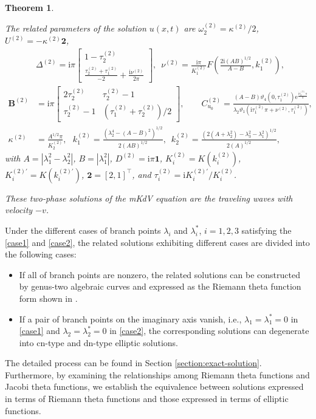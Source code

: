 \documentclass[11pt,reqno]{amsart}
\newcommand{\ii}{\mathrm{i}}
\newcommand{\cn}{\mathrm{cn}}
\newcommand{\dn}{\mathrm{dn}}
\newcommand{\ee}{\mathrm{e}}
\newtheorem{theorem}{Theorem}
\numberwithin{equation}{section}
\begin{document}
\begin{theorem}
\begin{itemize}
		The related parameters of the solution $u(x,t)$ are $\omega_{2}^{(2)}=\kappa^{(2)}/2$, $U^{(2)}=-\kappa^{(2)}\mathbf{2}$,
		\begin{subequations}\label{eq:u-parameters-cn}
			\begin{align}
				&
				\Delta^{(2)}=\ii \pi \begin{bmatrix}
					1-\tau^{(2)}_2 \\
					\frac{\tau^{(2)}_2+\tau^{(2)}_1}{-2}+\frac{\ii\nu^{(2)} }{2 \pi}
				\end{bmatrix},\,\,\, \nu^{(2)}=\frac{\ii \pi}{ K^{(2)}_1}F\left(\frac{2\ii(AB)^{1/2}}{A-B}, k^{(2)}_1\right)\!, \,\,\, \label{eq:u-parameters-cn-U}\\
					\mathbf{B}^{(2)}&=\ii \pi \begin{bmatrix}
					2 \tau^{(2)}_2  & \tau^{(2)}_2-1 \\ 
					\tau^{(2)}_2-1 & (\tau^{(2)}_1+\tau^{(2)}_2)/2
				\end{bmatrix},  \qquad 	C_{u_0}^{(2)}=\frac{(A-B)\vartheta_4(0,\tau^{(2)}_1)\ee^{\frac{\ii\tau^{(2)}_2\pi}{4}}}{\lambda_2\vartheta_1(\ii\tau^{(2)}_1\pi+\nu ^{(2)},\tau^{(2)}_1)}, \label{eq:u-parameters-cn-B}\\			 
				 \kappa^{(2)}&=\frac{A^{1/2} \pi}{K^{(2)}_2}
, \,\,\,\,  k^{(2)}_1=\frac{(\lambda_2^4-(A-B)^2)^{1/2}}{2(AB)^{1/2}}, \,\,\,
				 k^{(2)}_2=\frac{(2(A+\lambda_2^2)-\lambda_3^2-\lambda_1^2)^{1/2}}{2(A)^{1/2}},\label{eq:u-parameters-cn-k}
			\end{align}
		\end{subequations}
		with $A=|\lambda_1^2-\lambda_2^2|$, $B=|\lambda_1^2|$, $D^{(2)}=\ii \pi \mathbf{1}$, $K^{(2)}_i=K(k^{(2)}_i)$, $K^{{(2)}\prime}_i=K(k^{{(2)}\prime}_i)$, $\mathbf{2}=[2,1]^{\top}$, and $\tau^{(2)}_i=\ii K^{{(2)}\prime}_i/K^{(2)}_i$.
	\end{itemize}
	These two-phase solutions of the mKdV equation are the traveling waves with velocity $-v$. 
\end{theorem}


	Under the different cases of branch points $\lambda_i$ and $\lambda_i^*$, $i=1,2,3$ satisfying the \ref{case1} and \ref{case2}, the related solutions exhibiting different cases are divided into the following cases:
	\begin{itemize}
		\item If all of branch points are nonzero, the related solutions can be constructed by genus-two algebraic curves and expressed as the Riemann theta function form shown in .
		\item If a pair of branch points on the imaginary axis vanish, i.e., $\lambda_1=\lambda_1^*=0$ in \ref{case1} and $\lambda_2=\lambda_2^*=0$ in \ref{case2}, the corresponding solutions can degenerate into $\cn$-type and $\dn$-type elliptic solutions.
	\end{itemize}
The detailed process can be found in Section \ref{section:exact-solution}. Furthermore, by examining the relationships among Riemann theta functions and Jacobi theta functions, we establish the equivalence between solutions expressed in terms of Riemann theta functions and those expressed in terms of elliptic functions.
\end{document}
